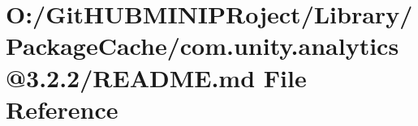 \hypertarget{_library_2_package_cache_2com_8unity_8analytics_0D3_82_82_2_r_e_a_d_m_e_8md}{}\section{O\+:/\+Git\+H\+U\+B\+M\+I\+N\+I\+P\+Roject/\+Library/\+Package\+Cache/com.unity.\+analytics@3.2.2/\+R\+E\+A\+D\+ME.md File Reference}
\label{_library_2_package_cache_2com_8unity_8analytics_0D3_82_82_2_r_e_a_d_m_e_8md}
